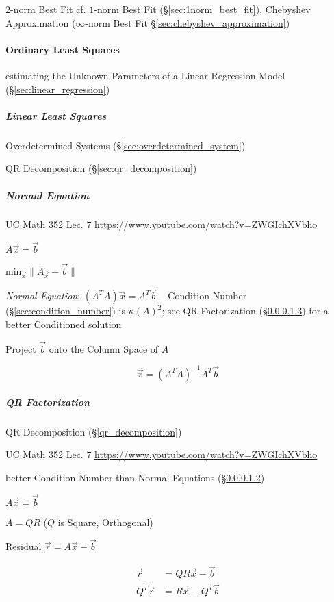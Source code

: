 $2$-norm Best Fit \fist cf. $1$-norm Best Fit (\S\ref{sec:1norm_best_fit}),
Chebyshev Approximation ($\infty$-norm Best Fit
\S\ref{sec:chebyshev_approximation})



\paragraph{Ordinary Least Squares}\label{sec:ordinary_least_squares}\hfill

estimating the Unknown Parameters of a Linear Regression Model
(\S\ref{sec:linear_regression})



\subparagraph{Linear Least Squares}\label{sec:linear_least_squares}\hfill

Overdetermined Systems (\S\ref{sec:overdetermined_system})

QR Decomposition (\S\ref{sec:qr_decomposition})



\subparagraph{Normal Equation}\label{sec:normal_equation}\hfill

UC Math 352 Lec. 7 \url{https://www.youtube.com/watch?v=ZWGIchXVbho}

$A\vec{x} = \vec{b}$

$\mathrm{min}_\vec{x} \|A_\vec{x} - \vec{b}\|$

\emph{Normal Equation}: $(A^TA)\vec{x} = A^T\vec{b}$ -- Condition Number
(\S\ref{sec:condition_number}) is $\kappa(A)^2$; see QR Factorization
(\S\ref{sec:qr_factorization}) for a better Conditioned solution

Project $\vec{b}$ onto the Column Space of $A$

\[
  \vec{x} = (A^TA)^{-1}A^T\vec{b}
\]



\subparagraph{QR Factorization}\label{sec:qr_factorization}\hfill

QR Decomposition (\S\ref{qr_decomposition})

UC Math 352 Lec. 7 \url{https://www.youtube.com/watch?v=ZWGIchXVbho}

better Condition Number than Normal Equations (\S\ref{sec:normal_equation})

$A\vec{x} = \vec{b}$

$A = QR$ ($Q$ is Square, Orthogonal)

Residual $\vec{r} = A\vec{x} - \vec{b}$

\begin{align*}
     \vec{r} & = QR\vec{x} - \vec{b} \\
  Q^T\vec{r} & = R\vec{x} - Q^T\vec{b} \\
\end{align*}

